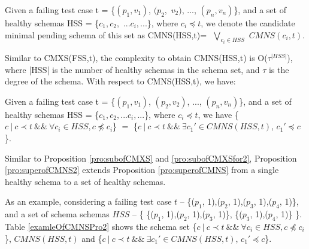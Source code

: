 \documentclass{sig-alternate-05-2015}
\begin{document}
{\begin{definition}
Given a failing test case t = \{$(p_{1}, v_{1})$, $(p_{2}, $ $v_{2})$, ..., $(p_{n}, v_{n})$\}, and a set of healthy schemas HSS = \{$c_{1} , c_{2},$ $  ...c_{i}, ...$\}, where $ c_{i} \preceq t$, we denote the candidate minimal pending schema of this set as CMNS(HSS,t)= $ $ $\bigvee_{c_{i}\in HSS}$ $ CMNS(c_{i}, t)$.
\end{definition}

Similar to CMXS(FSS,t), the complexity to obtain CMNS(HSS,t) is O($\tau^{|HSS|}$), where |HSS| is the number of healthy schemas in the schema set, and $\tau$ is the degree of the schema. With respect to CMNS(HSS,t), we have:

\begin{proposition}\label{pro:superofCMNS2}
Given a failing test case t = \{$(p_{1}, v_{1})$, $(p_{2}, v_{2})$, ..., $(p_{n}, v_{n})$\}, and a set of healthy schemas HSS = \{$c_{1} , c_{2}, ... c_{i}, ...$\}, where $ c_{i} \preceq t$,  we have \{$c\ |\ c \prec t\ \&\&\ \forall c_{i} \in HSS, c \npreceq c_{i} $\} $=$  \{$ c\ |\ c \prec t \ \&\& \ \exists c_{1}' \in CMNS(HSS, t)$, $c_{1}' \preceq c$\}.
\end{proposition}

Similar to Proposition \ref{pro:subofCMXS} and \ref{pro:subofCMXSfor2},  Proposition \ref{pro:superofCMNS2} extends Proposition \ref{pro:superofCMNS} from a single healthy schema to a set of healthy schemas.

As an example, considering a failing test case $t$ -- \{($p_{1}$, 1),($p_{2}$, 1),($p_{3}$, 1),($p_{4}$, 1)\}, and a set of schema schemas  $HSS$ -- \{ \{($p_{1}$, 1),($p_{2}$, 1),($p_{3}$, 1)\},  \{($p_{3}$, 1),($p_{4}$, 1)\} \}. Table \ref{examleOfCMNSPro2} shows the schema set \{$c\ |\ c \prec t\ \&\&\ \forall c_{i} \in HSS, c \npreceq c_{i} $\}, $CMNS(HSS, t)$ and \{$ c\ |\ c \prec t \ \&\& \ \exists c_{1}' \in CMNS(HSS, t)$, $c_{1}' \preceq c$\}.


}
\end{document}
